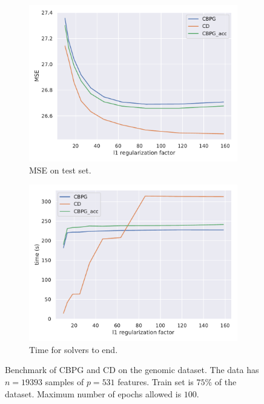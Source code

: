 \documentclass[a4]{article}
\begin{document}
\begin{figure}[!h]
	\begin{subfigure}{.45\textwidth}
	\centering
	\includegraphics[scale=.43]{prebuilt_images/simulated_n19393p531_snrgenom_MSE_rd.pdf}
	\caption{MSE on test set.}
	\end{subfigure}
	\begin{subfigure}{.45\textwidth}
	\includegraphics[scale=.43]{prebuilt_images/simulated_n19393p531_snrgenom_TIME_rd.pdf}
	\caption{Time for solvers to end.}
	\end{subfigure}
	\caption{Benchmark of CBPG and CD on the genomic dataset. The data has $n=19393$ samples of $p=531$ features. Train set is $75\%$ of the dataset.
    Maximum number of epochs allowed is $100$.}
	\label{fig:bench_genom}
\end{figure}
\end{document}
